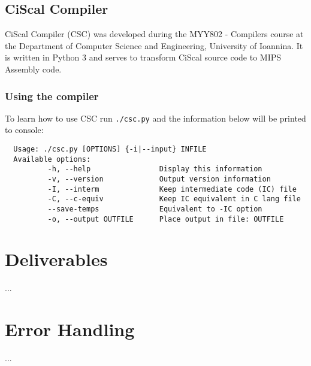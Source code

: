 \documentclass{article}
\begin{document}
\subsection{CiScal Compiler}
CiScal Compiler (CSC) was developed during the MYY802 - Compilers course at the Department of
Computer Science and Engineering, University of Ioannina. It is written in Python 3 and serves
to transform CiScal source code to MIPS Assembly code.

\subsubsection{Using the compiler}
To learn how to use CSC run \verb|./csc.py| and the information below will be printed to console:

\begin{verbatim}
  Usage: ./csc.py [OPTIONS] {-i|--input} INFILE
  Available options:
          -h, --help                Display this information
          -v, --version             Output version information
          -I, --interm              Keep intermediate code (IC) file
          -C, --c-equiv             Keep IC equivalent in C lang file
          --save-temps              Equivalent to -IC option
          -o, --output OUTFILE      Place output in file: OUTFILE
\end{verbatim}

\pagebreak



\section{Deliverables}

...


\section{Error Handling}

...


\pagebreak

\end{document}
